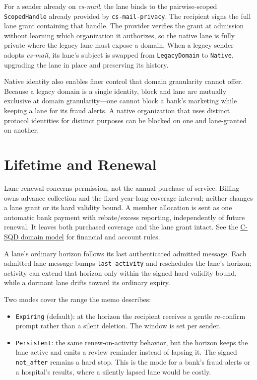 \documentclass[11pt]{article}
\begin{document}
For a sender already on \textit{cs-mail}, the lane binds to the pairwise-scoped
\texttt{ScopedHandle} already provided by \texttt{cs-mail-privacy}. The recipient
signs the full lane grant containing that handle. The provider verifies the grant at admission
without learning which organization it authorizes, so the native lane is fully
private where the legacy lane must expose a domain. When a legacy sender adopts
\textit{cs-mail}, its lane's subject is swapped from \texttt{LegacyDomain} to
\texttt{Native}, upgrading the lane in place and preserving its history.

Native identity also enables finer control that domain granularity cannot offer.
Because a legacy domain is a single identity, block and lane are mutually
exclusive at domain granularity---one cannot block a bank's marketing while
keeping a lane for its fraud alerts. A native organization that uses distinct
protocol identities for distinct purposes can be blocked on one and lane-granted
on another.

\section{Lifetime and Renewal}

Lane renewal concerns permission, not the annual purchase of service. Billing
owns advance collection and the fixed year-long coverage interval; neither changes
a lane grant or its hard validity bound. A member allocation is sent as one
automatic bank payment with rebate/excess reporting, independently of future
renewal. It leaves both purchased coverage and the lane grant intact. See the
\href{DOMAIN_MODEL.md}{C-SQD domain model} for financial and account rules.

A lane's ordinary horizon follows its last authenticated admitted message. Each
admitted lane message bumps \texttt{last\_activity} and reschedules the lane's
horizon; activity can extend that horizon only within the signed hard validity bound,
while a dormant lane drifts toward its ordinary expiry.

Two modes cover the range the memo describes:

\begin{itemize}[leftmargin=2em]
    \item \texttt{Expiring} (default): at the horizon the recipient receives a
    gentle re-confirm prompt rather than a silent deletion. The window is set per
    sender.
    \item \texttt{Persistent}: the same renew-on-activity behavior, but the horizon
    keeps the lane active and emits a review reminder instead of lapsing it. The
    signed \texttt{not\_after} remains a hard stop. This is the mode for a
    bank's fraud alerts or a hospital's results, where a silently lapsed lane
    would be costly.
\end{itemize}
\end{document}

